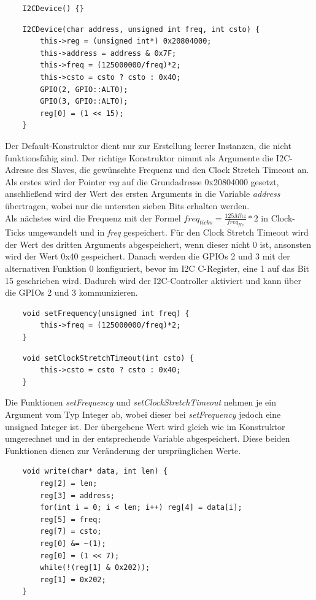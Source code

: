 \documentclass[12pt]{article}
\begin{document}
\begin{verbatim}
    I2CDevice() {}
\end{verbatim}
\begin{verbatim}
    I2CDevice(char address, unsigned int freq, int csto) {
        this->reg = (unsigned int*) 0x20804000;
        this->address = address & 0x7F;
        this->freq = (125000000/freq)*2;
        this->csto = csto ? csto : 0x40;
        GPIO(2, GPIO::ALT0);
        GPIO(3, GPIO::ALT0);
        reg[0] = (1 << 15);
    }
\end{verbatim}
\vspace{-2mm}
Der Default-Konstruktor dient nur zur Erstellung leerer Instanzen, die nicht funktionsfähig sind. Der richtige Konstruktor nimmt als Argumente die I2C-Adresse des Slaves, die gewünschte Frequenz und den Clock Stretch Timeout an. Als erstes wird der Pointer \textit{reg} auf die Grundadresse 0x20804000 gesetzt, anschließend wird der Wert des ersten Arguments in die Variable \textit{address} übertragen, wobei nur die untersten sieben Bits erhalten werden.\\
Als nächstes wird die Frequenz mit der Formel $freq_{ticks} = \frac{125 Mhz}{freq_{Hz}} * 2$ in Clock-Ticks umgewandelt und in \textit{freq} gespeichert. Für den Clock Stretch Timeout wird der Wert des dritten Arguments abgespeichert, wenn dieser nicht 0 ist, ansonsten wird der Wert 0x40 gespeichert. Danach werden die GPIOs 2 und 3 mit der alternativen Funktion 0 konfiguriert, bevor im I2C C-Register, eine 1 auf das Bit 15 geschrieben wird. Dadurch wird der I2C-Controller aktiviert und kann über die GPIOs 2 und 3 kommunizieren.\\
\begin{verbatim}
    void setFrequency(unsigned int freq) {
        this->freq = (125000000/freq)*2;
    }
\end{verbatim}
\begin{verbatim}
    void setClockStretchTimeout(int csto) {
        this->csto = csto ? csto : 0x40;
    }
\end{verbatim}
\vspace{-2mm}
Die Funktionen \textit{setFrequency} und \textit{setClockStretchTimeout} nehmen je ein Argument vom Typ Integer ab, wobei dieser bei \textit{setFrequency} jedoch eine unsigned Integer ist. Der übergebene Wert wird gleich wie im Konstruktor umgerechnet und in der entsprechende Variable abgespeichert. Diese beiden Funktionen dienen zur Veränderung der ursprünglichen Werte.\\
\begin{verbatim}
    void write(char* data, int len) {
        reg[2] = len;
        reg[3] = address;
        for(int i = 0; i < len; i++) reg[4] = data[i];
        reg[5] = freq;
        reg[7] = csto;
        reg[0] &= ~(1);
        reg[0] = (1 << 7);
        while(!(reg[1] & 0x202));
        reg[1] = 0x202;
    }
\end{verbatim}
\end{document}
